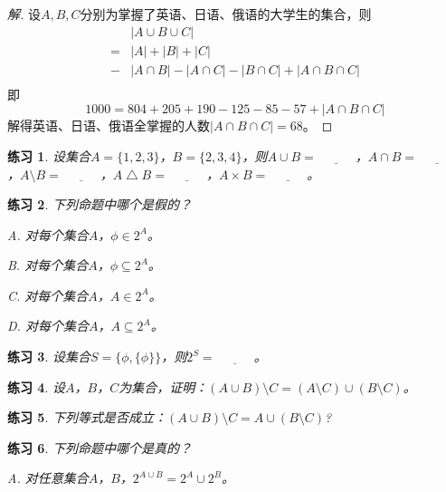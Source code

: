 \documentclass{book}[oneside]
\newtheorem{Exercise}{练习}[chapter]
\begin{document}
\begin{CJK*}{UTF8}{gbsn}
\begin{proof}[解]
  设$A,B,C$分别为掌握了英语、日语、俄语的大学生的集合，则
  \begin{equation*}
    \begin{split}
      &|A \cup B \cup C|\\
      = &|A| + |B| + |C|\\
      - & |A \cap B| - |A \cap C| - |B \cap C| + |A \cap B \cap C|\\
    \end{split}
  \end{equation*}
  即
  \begin{equation*}
    1000 = 804 + 205 + 190 - 125 - 85 - 57 +  |A \cap B \cap C|
  \end{equation*}
  解得英语、日语、俄语全掌握的人数$|A \cap B \cap C|=68$。
\end{proof}

  \begin{Exercise}
    设集合$A=\{1,2,3\}$，$B=\{2,3,4\}$，则$A\cup B=\underline{\quad\quad\quad}$，$A\cap B=\underline{\quad\quad\quad}$，$A\setminus B=\underline{\quad\quad\quad}$，$A\bigtriangleup B=\underline{\quad\quad\quad}$，$A\times B=\underline{\quad\quad\quad}$。
  \end{Exercise}
  \begin{Exercise}
    下列命题中哪个是假的？

    A. 对每个集合$A$，$\phi \in 2^A$。

    B. 对每个集合$A$，$\phi \subseteq 2^A$。

    C. 对每个集合$A$，$A \in 2^A$。

    D. 对每个集合$A$，$A \subseteq 2^A$。
  \end{Exercise}
    \begin{Exercise}
   设集合$S=\{\phi, \{\phi\}\}$，则$2^S=\underline{\quad\quad\quad}$。
  \end{Exercise}
  \begin{Exercise}
   设$A$，$B$，$C$为集合，证明：$(A\cup B) \setminus C = (A\setminus C) \cup
   (B\setminus C)$。
 \end{Exercise}
    \begin{Exercise}
      下列等式是否成立：$(A\cup B) \setminus C = A \cup (B\setminus C)$?
    \end{Exercise}

  \begin{Exercise}
下列命题中哪个是真的？

A. 对任意集合$A$，$B$，$2^{A\cup B} = 2^A \cup 2^B$。


\end{Exercise}
\end{CJK*}
\end{document}
